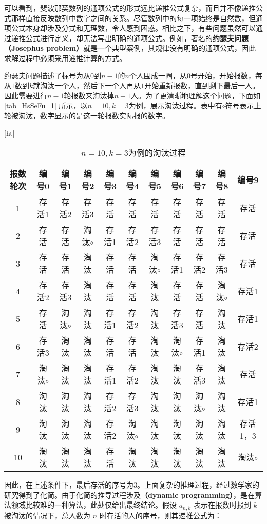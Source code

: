 可以看到，斐波那契数列的通项公式的形式远比递推公式复杂，而且并不像递推公式那样直接反映数列中数字之间的关系。尽管数列中的每一项始终是自然数，但通项公式本身却涉及分式和无理数，令人感到困惑。相比之下，有些问题虽然可以通过递推公式进行定义，却无法写出明确的通项公式。例如，著名的\textbf{约瑟夫问题（Josephus problem）}就是一个典型案例，其规律没有明确的通项公式，因此求解过程中必须采用递推计算的方式。

约瑟夫问题描述了标号为从$0$到$n-1$的$n$个人围成一圈，从$0$号开始，开始报数，每从$1$数到$k$就淘汰一个人，然后下一个人再从$1$开始重新报数，直到剩下最后一人。因此需要进行$n-1$轮报数来淘汰掉$n-1$人。为了更清晰地理解这个问题，下面如\autoref{tab_HsSeFu_1} 所示，以$n=10,k=3$为例，展示淘汰过程。表中有$\circ$符号表示上轮被淘汰，数字显示的是这一轮报数实际报的数字。

\begin{table}\label{tab_HsSeFu_1}[ht]
\centering
\caption{$n=10,k=3$为例的淘汰过程}\label{tab_HsSeFu1}
\begin{tabular}{|c|c|c|c|c|c|c|c|c|c|c|}
\hline
报数轮次 & 编号0& 编号1& 编号2 & 编号3 & 编号4& 编号5 & 编号6& 编号7 & 编号8& 编号9\\
\hline
1 & 存活1 & 存活2 &存活3 &存活 &存活 &存活 &存活 &存活 &存活 &存活\\
\hline
2 & 存活 & 存活 &淘汰$\circ$ &存活1 &存活2 &存活3 &存活 &存活 &存活 &存活\\
\hline
3 & 存活 & 存活 &淘汰 &存活 &存活 &淘汰$\circ$ &存活1 &存活2 &存活3 &存活\\
\hline
4 & 存活2 & 存活3 &淘汰 &存活 &存活 &淘汰 &存活 &存活 &淘汰$\circ$ &存活1\\
\hline
5 & 存活 & 淘汰$\circ$ &淘汰 &存活1 &存活2 &淘汰 &存活3 &存活 &淘汰 &存活1\\
\hline
6 & 存活3 & 淘汰 &淘汰 &存活 &存活&淘汰 &淘汰$\circ$ &存活1&淘汰 &存活2\\
\hline
7 & 淘汰$\circ$ & 淘汰 &淘汰 &存活1 &存活2 &淘汰 &淘汰 &存活3 &淘汰 &存活\\
\hline
8 & 淘汰 & 淘汰 &淘汰 &存活2 &存活3 &淘汰 &淘汰 &淘汰$\circ$ &淘汰 &存活1\\
\hline
9 & 淘汰 & 淘汰 &淘汰 &存活2 &淘汰$\circ$ &淘汰 &淘汰 &淘汰 &淘汰 &存活1，3\\
\hline
10 & 淘汰 & 淘汰 &淘汰 &存活 &淘汰 &淘汰 &淘汰 &淘汰 &淘汰 & 淘汰$\circ$ \\
\hline
\end{tabular}
\end{table}

因此，在上述条件下，最后存活的序号为3。上面复杂的推理过程，经过数学家的研究得到了化简。由于化简的推导过程涉及\textbf{（dynamic programming）}，是在算法领域比较难的一种算法，此处仅给出最终结论。假设 $a_{n,k}$ 表示在报数时报到 $k$ 被淘汰的情况下，总人数为 $n$ 时存活的人的序号，则其递推公式为：


